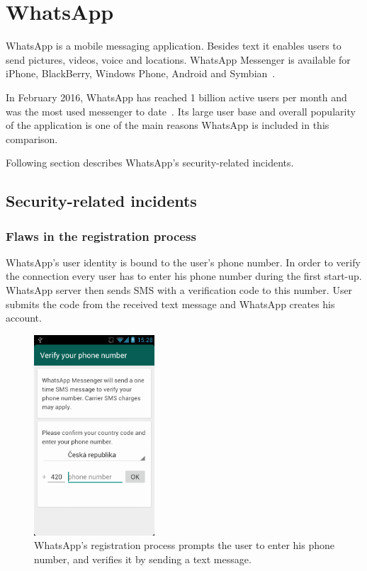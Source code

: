\documentclass[thesis=M,english]{FITthesis}[2012/10/20]
\begin{document}
\section{WhatsApp}\label{whatsapp}

WhatsApp is a mobile messaging application. Besides text it enables users to send pictures, videos, voice and locations. WhatsApp Messenger is available for iPhone, BlackBerry, Windows Phone, Android and Symbian~\cite{whatsapphomepage}.

In February 2016, WhatsApp has reached 1 billion active users per month and was the most used messenger to date~\cite{whatsappusers}. Its large user base and overall popularity of the application is one of the main reasons WhatsApp is included in this comparison.

Following section describes WhatsApp's security-related incidents.

\subsection{Security-related incidents}

\subsubsection{Flaws in the registration process}\label{whatsapp-registration}

WhatsApp's user identity is bound to the user's phone number. In order to verify the connection every user has to enter his phone number during the first start-up. WhatsApp server then sends SMS with a verification code to this number. User submits the code from the received text message and WhatsApp creates his account.  

\begin{figure}[htb]
	\centering
	\includegraphics[width=0.4\textwidth]{whatsapp-registration.png}
	\caption[WhatsApp's registration process]{WhatsApp's registration process prompts the user to enter his phone number, and verifies it by sending a text message.}
	\label{img:whatsapp_reg}
\end{figure}
\end{document}
